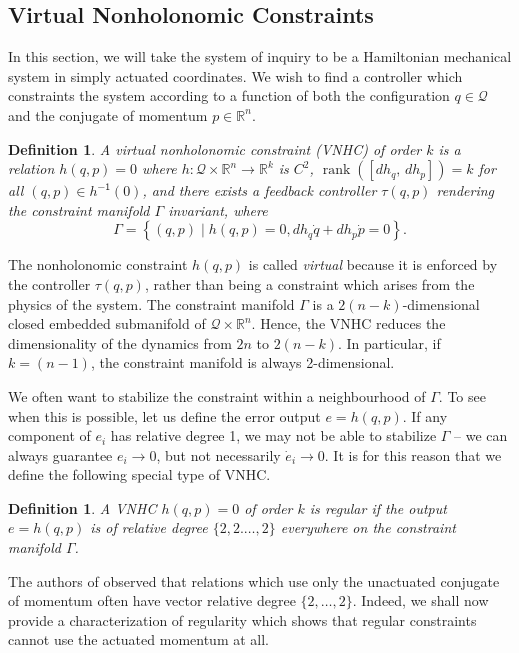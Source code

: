 \documentclass[journal,twoside,web]{ieeecolor}
\newtheorem{defn}[thm]{Definition} %
\DeclareMathOperator{\Rank}{rank}
\newcommand*{\rank}[1]{\Rank\left(#1\right)}
\newcommand*{\inv}{^\mathsf{-1}}
\newcommand*{\R}{\mathbb{R}}
\begin{document}
\subsection{Virtual Nonholonomic Constraints}

In this section, we will take the system of inquiry to be a Hamiltonian
mechanical system in simply actuated coordinates.
We wish to find a controller which constraints the system according to a
function of both the configuration \(q \in \mathcal{Q}\) and the conjugate of
momentum \(p \in \R^n\).

\begin{defn}\label{defn:vnhc}
    A \textit{virtual nonholonomic constraint} (VNHC) \textit{of order \(k\)} is a
    relation \(h(q,p) = 0\) where \(h : \mathcal{Q}\times\R^n \rightarrow \R^k\) is
    \(C^2\), \(\rank{\left[ dh_q,\, dh_p \right]} = k\) for all 
    \((q,p) \in h\inv(0)\), and there exists a feedback controller \(\tau(q,p)\)
    rendering the \textit{constraint manifold} \(\Gamma\) invariant,
    where
    \[
        \Gamma = \left\{(q,p) \mid h(q,p) = 0, dh_q \dot{q} + dh_p \dot{p} = 0\right\}
        .
    \]
\end{defn}

The nonholonomic constraint \(h(q,p)\) is called \textit{virtual} because it is
enforced by the controller \(\tau(q,p)\), rather than being a constraint which
arises from the physics of the system.
The constraint manifold \(\Gamma\) is a \(2(n-k)\)-dimensional
closed embedded submanifold of \(\mathcal{Q} \times \R^n\).
Hence, the VNHC reduces the dimensionality of the dynamics from \(2n\) to
\(2(n-k)\). 
In particular, if \(k = (n-1)\), the constraint manifold is always
2-dimensional. 

We often want to stabilize the constraint within a neighbourhood of \(\Gamma\).
To see when this is possible, let us define the error output \(e = h(q,p)\).
If any component of \(e_i\) has relative degree 1, we may not be able
to stabilize \(\Gamma\) -- we can always guarantee \(e_i \to 0\), but not
necessarily \(\dot{e}_i \to 0\).
It is for this reason that we define the following special type of VNHC.

\begin{defn}
    A VNHC \(h(q,p) = 0\) of order \(k\) is \textit{regular} if the output 
    \(e = h(q,p)\) is of relative degree \(\{2,2.\ldots,2\}\) everywhere on the
    constraint manifold \(\Gamma\).
\end{defn}


The authors of
\cite{nhvc_dynamic_walking,hybrid_zero_dynamics_bipedal_nhvcs,nhvc_incline_walking}
observed that relations which use only the unactuated conjugate of momentum
often have vector relative degree \(\{2,\ldots,2\}\).
Indeed, we shall now provide a characterization of regularity which shows that
regular constraints cannot use the actuated momentum at all.
\end{document}
